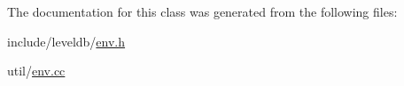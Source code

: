 The documentation for this class was generated from the following files\+:\begin{DoxyCompactItemize}
\item 
include/leveldb/\hyperlink{env_8h}{env.\+h}\item 
util/\hyperlink{env_8cc}{env.\+cc}\end{DoxyCompactItemize}
